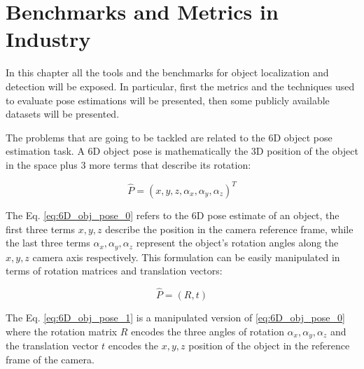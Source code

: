 \chapter{Benchmarks and Metrics in Industry}\label{ch:benchmarks_and_metrics}
In this chapter all the tools and the benchmarks for object localization and detection will be exposed. In particular, first the metrics and the techniques used to evaluate pose estimations will be presented, then some publicly available datasets will be presented. 

The problems that are going to be tackled are related to the 6D object pose estimation task. A 6D object pose is mathematically the 3D position of the object in the space plus 3 more terms that describe its rotation:

\begin{equation}
    \label{eq:6D_obj_pose_0}
    \hat{P} = (x, y, z, \alpha_x, \alpha_y, \alpha_z)^T
\end{equation}

The Eq. \ref{eq:6D_obj_pose_0} refers to the 6D pose estimate of an object, the first three terms $x, y, z$ describe the position in the camera reference frame, while the last three terms $\alpha_x, \alpha_y, \alpha_z$ represent the object's rotation angles along the $x, y, z$ camera axis respectively. This formulation can be easily manipulated in terms of rotation matrices and translation vectors:

\begin{equation}
    \label{eq:6D_obj_pose_1}
    \hat{P} = (R, t)
\end{equation}

The Eq. \ref{eq:6D_obj_pose_1} is a manipulated version of \ref{eq:6D_obj_pose_0} where the rotation matrix $R$ encodes the three angles of rotation $\alpha_x, \alpha_y, \alpha_z$ and the translation vector $t$ encodes the $x, y, z$ position of the object in the reference frame of the camera.

